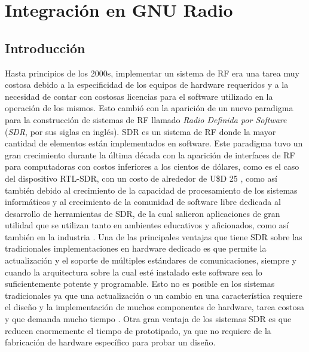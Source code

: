 \chapter{Integración en GNU Radio}\label{ch:gnuradio}

\section{Introducción}\label{subc:gr_congen}

Hasta principios de los 2000s, implementar un sistema de RF era una tarea muy costosa debido a la especificidad de los equipos de hardware requeridos y a la necesidad de contar con costosas licencias para el software utilizado en la operación de los mismos. Esto cambió con la aparición de un nuevo paradigma para la construcción de sistemas de RF llamado \emph{Radio Definida por Software} (\emph{SDR}, por sus siglas en inglés). SDR es un sistema de RF donde la mayor cantidad de elementos están implementados en software.  Este paradigma tuvo un gran crecimiento durante la última década con la aparición de interfaces de RF para computadoras con costos inferiores a los cientos de dólares, como es el caso del dispositivo RTL-SDR, con un costo de alrededor de U\$D 25 \cite{bib:rtl_sdr}, como así también debido al crecimiento de la capacidad de procesamiento de los sistemas informáticos y al crecimiento de la comunidad de software libre dedicada al desarrollo de herramientas de SDR, de la cual salieron aplicaciones de gran utilidad que se utilizan tanto en ambientes educativos y aficionados, como así también en la industria \cite{bib:federico_larocca}. Una de las principales ventajas que tiene SDR sobre las tradicionales implementaciones en hardware dedicado es que permite la actualización y el soporte de múltiples estándares de comunicaciones, siempre y cuando la arquitectura sobre la cual esté instalado este software sea lo suficientemente potente y programable. Esto no es posible en los sistemas tradicionales ya que una actualización o un cambio en una característica requiere el diseño y la implementación de muchos componentes de hardware, tarea costosa y que demanda mucho tiempo \cite{bib:gr_fm}. Otra gran ventaja de los sistemas SDR es que reducen enormemente el tiempo de prototipado, ya que no requiere de la fabricación de hardware específico para probar un diseño.

